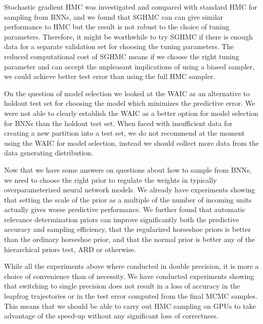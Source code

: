 \documentclass[12pt]{report}
\begin{document}
Stochastic gradient HMC was investigated and compared with standard HMC for sampling from BNNs, and we found that SGHMC can can give similar performance to HMC but the result is not robust to the choice of tuning parameters. Therefore, it might be worthwhile to try SGHMC if there is enough data for a separate validation set for choosing the tuning parameters. The reduced computational cost of SGHMC means if we choose the right tuning parameter and can accept the unpleasant implications of using a biased sampler, we could achieve better test error than using the full HMC sampler.

On the question of model selection we looked at the WAIC as an alternative to holdout test set for choosing the model which minimizes the predictive error. We were not able to clearly establish the WAIC as a better option for model selection for BNNs than the holdout test set. When faced with insufficient data for creating a new partition into a test set, we do not recommend at the moment using the WAIC for model selection, instead we should collect more data from the data generating distribution.

Now that we have some answers on questions about how to sample from BNNs, we need to choose  the right prior to regulate the weights in typically overparameterized neural network models. We already have experiments showing that setting the scale of the prior as a multiple of the number of incoming units actually gives worse predictive performance. We further found that automatic relevance determination priors can improve significantly both the predictive accuracy and sampling efficiency, that the regularized horseshoe priors is better than the ordinary horseshoe prior, and that the normal prior is better any of the hierarchical priors test, ARD or otherwise. 

While all the experiments above where conducted in double precision, it is more a choice of convenience than of necessity. We have conducted experiments showing that switching to single precision does not result in a loss of accuracy in the leapfrog trajectories or in the test error computed from the final MCMC samples. This means that we should be able to carry out HMC sampling on GPUs to take advantage of the speed-up without any significant loss of correctness.
\end{document}
